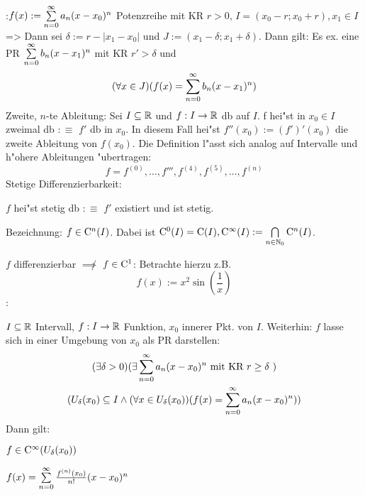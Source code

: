 \lessertheorem:$f(x):=\sumn 0 a_n (x-x_0)^n$ Potenzreihe mit KR $r>0$, 
  $I=(x_0-r;x_0+r),x_1\in I$ =>{
  Dann sei $\delta:=r-|x_1-x_0|$ und 
  $ J:=(x_1-\delta;x_1+\delta)$. Dann gilt: Es ex. eine PR 
  $\sumn 0 b_n (x-x_1)^n$ mit KR $r'>\delta$ und 
  \[(\forall x\in J)(f(x)=\sumn 0 b_n (x-x_1)^n)
    \]
  }
 Zweite, $n$-te Ableitung:{
  Sei $I\subseteq\mathbb R$ und $f:I\to\mathbb R$ db auf $I$. f hei"st in 
  $x_0\in I$ zweimal db $:\equiv$ $f'$ db in $x_0$. In diesem Fall hei"st
  $f''(x_0):=(f')'(x_0)$ die zweite Ableitung von $f(x_0)$. Die Definition l"asst
  sich analog auf Intervalle und h"ohere Ableitungen "ubertragen:
  \[f=f^{(0)},\ldots,f''',f^{(4)},f^{(5)},\ldots,f^{(n)}
    \]
  }
 Stetige Differenzierbarkeit:{
  $f$ hei"st stetig db $:\equiv$ $f'$ existiert und ist stetig.
  
  Bezeichnung: $f\in {\rm C}^n(I)$. Dabei ist ${\rm C}^0(I)={\rm C}(I),
  {\rm C}^\infty(I):=\bigcap\limits_{n\in\mathbb N_0}{\rm C}^n(I)$.
  }
\remark $f$ differenzierbar $\not\implies$ $f\in{\rm C}^1$:{
  Betrachte hierzu z.B.
  \[f(x):=x^2\sin\left(\frac 1 x\right)
    \]
  }
\remark:{
  $I\subseteq\mathbb R$ Intervall, $f:I\to\mathbb R$ Funktion, $x_0$ innerer Pkt. von $I$.
  Weiterhin: $f$ lasse sich in einer Umgebung von $x_0$ als PR darstellen:
  \begin{multline*}
    (\exists \delta>0)(\exists \sumn 0 a_n(x-x_0)^n 
    \text{ mit KR $r\ge\delta$ }) \\
    (U_\delta(x_0)\subseteq I\land 
    (\forall x\in U_\delta(x_0))(f(x)=\sumn 0 a_n(x-x_0)^n))
    \end{multline*}
  Dann gilt: 
  \begin{stmts}
    \item $f\in {\rm C}^\infty(U_\delta(x_0))$ 
    \item $f(x)=\sumn 0 \frac{f^{(n)}(x_0)}{n!}(x-x_0)^n$ 
    \end{stmts}
}

